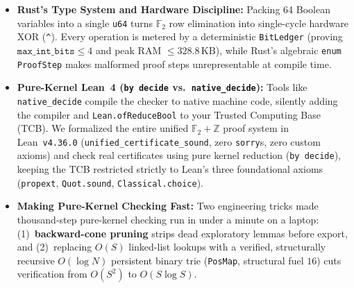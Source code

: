 \documentclass[11pt]{article}
\begin{document}
\begin{itemize}
  \item \textbf{Rust's Type System and Hardware Discipline:} Packing 64 Boolean variables into a single \texttt{u64} turns $\mathbb{F}_2$ row elimination into single-cycle hardware XOR (\verb|^|). Every operation is metered by a deterministic \texttt{BitLedger} (proving $\texttt{max\_int\_bits} \le 4$ and peak RAM $\le 328.8\,\text{KB}$), while Rust's algebraic \texttt{enum ProofStep} makes malformed proof steps unrepresentable at compile time.
  \item \textbf{Pure-Kernel Lean~4 (\texttt{by decide} vs.\ \texttt{native\_decide}):} Tools like \texttt{native\_decide} compile the checker to native machine code, silently adding the compiler and \texttt{Lean.ofReduceBool} to your Trusted Computing Base (TCB). We formalized the entire unified $\mathbb{F}_2 + \mathbb{Z}$ proof system in Lean~\texttt{v4.36.0} (\texttt{unified\_certificate\_sound}, zero \texttt{sorry}s, zero custom axioms) and check real certificates using pure kernel reduction (\texttt{by decide}), keeping the TCB restricted strictly to Lean's three foundational axioms (\texttt{propext}, \texttt{Quot.sound}, \texttt{Classical.choice}).
  \item \textbf{Making Pure-Kernel Checking Fast:} Two engineering tricks made thousand-step pure-kernel checking run in under a minute on a laptop: (1)~\textbf{backward-cone pruning} strips dead exploratory lemmas before export, and (2)~replacing $O(S)$ linked-list lookups with a verified, structurally recursive $O(\log N)$ persistent binary trie (\texttt{PosMap}, structural fuel $16$) cuts verification from $O(S^2)$ to $O(S \log S)$.
\end{itemize}

\begin{table}[!ht]
\centering
\caption{Real Rust UNSAT certificates pure-kernel verified (\texttt{by decide}) in Lean~\texttt{v4.36.0} (\texttt{lake build}: 22 jobs, 0 errors, 0 warnings, 0 \texttt{sorry}s).}
\label{tab:lean}
\end{table}
\end{document}
